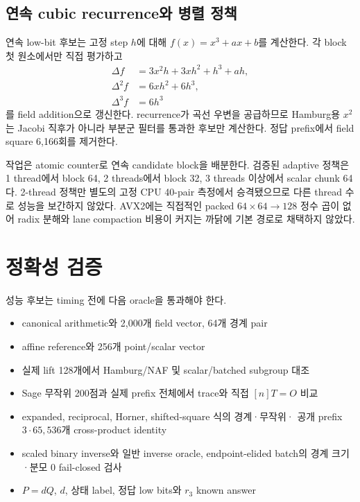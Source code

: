 \documentclass[10pt,a4paper]{article}
\begin{document}
\subsection{연속 cubic recurrence와 병렬 정책}

연속 low-bit 후보는 고정 step \(h\)에 대해
\(f(x)=x^3+ax+b\)를 계산한다. 각 block 첫 원소에서만 직접 평가하고
\[
\begin{aligned}
\Delta f   &=3x^2h+3xh^2+h^3+ah,\\
\Delta^2 f &=6xh^2+6h^3,\\
\Delta^3 f &=6h^3
\end{aligned}
\]
를 field addition으로 갱신한다. recurrence가 곡선 우변을 공급하므로
Hamburg용 \(x^2\)는 Jacobi 직후가 아니라 부분군 필터를 통과한 후보만
계산한다. 정답 prefix에서 field square 6,166회를 제거한다.

작업은 atomic counter로 연속 candidate block을 배분한다. 검증된 adaptive
정책은 1 thread에서 block 64, 2 threads에서 block 32, 3 threads
이상에서 scalar chunk 64다. 2-thread 정책만 별도의 고정 CPU
40-pair 측정에서 승격됐으므로 다른 thread 수로 성능을 보간하지 않았다.
AVX2에는 직접적인 packed \(64\times64\to128\) 정수 곱이 없어 radix
분해와 lane compaction 비용이 커지는 까닭에 기본 경로로 채택하지 않았다.

\section{정확성 검증}

성능 후보는 timing 전에 다음 oracle을 통과해야 한다.

\begin{itemize}
  \item canonical arithmetic와 2,000개 field vector, 64개 경계 pair
  \item affine reference와 256개 point/scalar vector
  \item 실제 lift 128개에서 Hamburg/NAF 및 scalar/batched subgroup 대조
  \item Sage 무작위 200점과 실제 prefix 전체에서 trace와 직접
        \([n]T=O\) 비교
  \item expanded, reciprocal, Horner, shifted-square 식의 경계·무작위·
        공개 prefix \(3\cdot65{,}536\)개 cross-product identity
  \item scaled binary inverse와 일반 inverse oracle, endpoint-elided
        batch의 경계 크기·분모 0 fail-closed 검사
  \item \(P=dQ\), \(d\), 상태 label, 정답 low bits와 \(r_3\) known answer
\end{itemize}
\end{document}
